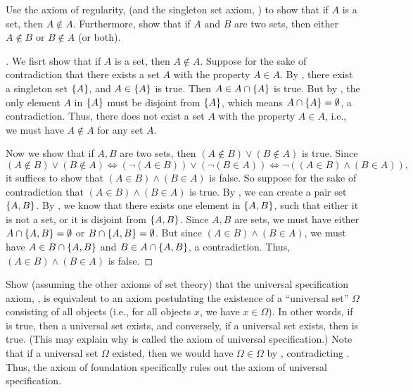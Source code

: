 \begin{ex}\label{i:ex:3.2.2}
  Use the axiom of regularity,  (and the singleton set axiom, ) to show that if \(A\) is a set, then \(A \notin A\).
  Furthermore, show that if \(A\) and \(B\) are two sets, then either \(A \notin B\) or \(B \notin A\) (or both).
\end{ex}

\begin{proof}[]
  We fisrt show that if \(A\) is a set, then \(A \notin A\).
  Suppose for the sake of contradiction that there exists a set \(A\) with the property \(A \in A\).
  By , there exist a singleton set \(\left\lbrace A\right\rbrace\), and \(A \in \left\lbrace A\right\rbrace\) is true.
  Then \(A \in A \cap \left\lbrace A\right\rbrace\) is true.
  But by , the only element \(A\) in \(\left\lbrace A\right\rbrace\) must be disjoint from \(\left\lbrace A\right\rbrace\), which means \(A \cap \left\lbrace A\right\rbrace = \emptyset\), a contradiction.
  Thus, there does not exist a set \(A\) with the property \(A \in A\), i.e., we must have \(A \notin A\) for any set \(A\).

  Now we show that if \(A, B\) are two sets, then \((A \notin B) \lor (B \notin A)\) is true.
  Since
  \[
    (A \notin B) \lor (B \notin A) \iff (\lnot(A \in B)) \lor (\lnot(B \in A)) \iff \lnot ((A \in B) \land (B \in A)),
  \]
  it suffices to show that \((A \in B) \land (B \in A)\) is false.
  So suppose for the sake of contradiction that \((A \in B) \land (B \in A)\) is true.
  By , we can create a pair set \(\left\lbrace A, B\right\rbrace\).
  By , we know that there exists one element in \(\left\lbrace A, B\right\rbrace\), such that either it is not a set, or it is disjoint from \(\left\lbrace A, B\right\rbrace\).
  Since \(A, B\) are sets, we must have either \(A \cap \left\lbrace A, B\right\rbrace = \emptyset\) or \(B \cap \left\lbrace A, B\right\rbrace = \emptyset\).
  But since \((A \in B) \land (B \in A)\), we must have \(A \in B \cap \left\lbrace A, B\right\rbrace\) and \(B \in A \cap \left\lbrace A, B\right\rbrace\), a contradiction.
  Thus, \((A \in B) \land (B \in A)\) is false.
\end{proof}

\begin{ex}\label{i:ex:3.2.3}
  Show (assuming the other axioms of set theory) that the universal specification axiom, , is equivalent to an axiom postulating the existence of a ``universal set'' \(\Omega\) consisting of all objects (i.e., for all objects \(x\), we have \(x \in \Omega\)).
  In other words, if  is true, then a universal set exists, and conversely, if a universal set exists, then  is true.
  (This may explain why  is called the axiom of universal specification.)
  Note that if a universal set \(\Omega\) existed, then we would have \(\Omega \in \Omega\) by , contradicting .
  Thus, the axiom of foundation specifically rules out the axiom of universal specification.
\end{ex}

